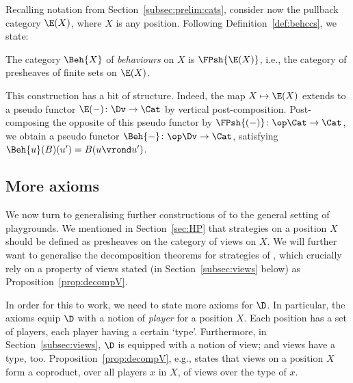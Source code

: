 \documentclass{LMCS}
\theoremstyle{plain}\newtheorem{satz}[thm]{Satz}
\begin{document}
   Recalling notation from Section~\ref{subsec:prelim:cats}, consider
   now the pullback category $\E(X)$, where $X$ is any position.
   Following Definition~\ref{def:behccs}, we state: \begin{defi}\label{def:beh}
  The category $\Beh{X}$ of \emph{behaviours} on $X$ is
  $\FPsh{\E(X)}$, i.e., the category of presheaves of finite sets on
  $\E (X)$.
\end{defi}
This construction has a bit of structure. Indeed, the
map $X \mapsto \E (X)$ extends to a pseudo functor $\E (-) \colon \Dv \to
\Cat$ by vertical post-composition.  Post-composing the opposite of
this pseudo functor by $\FPsh{(-)} \colon \op\Cat \to \Cat$, we obtain a
pseudo functor $\Beh{-} \colon \op\Dv \to \Cat$, satisfying $\Beh{u} (B) (u')
= B (u \vrond u')$.


\subsection{More axioms}
We now turn to generalising further constructions
of  to the general setting of
playgrounds.  We mentioned in Section~\ref{sec:HP} that strategies on
a position $X$ should be defined as presheaves on the category of
views on $X$.  We will further want to generalise the decomposition
theorems for strategies of , which
crucially rely on a property of views stated (in
Section~\ref{subsec:views} below) as Proposition~\ref{prop:decompV}.

In order for this to work, we need to state more axioms for $\D$.  In
particular, the axioms equip $\D$ with a notion of \emph{player} for a
position $X$.  Each position has a set of players, each player having
a certain `type'.  Furthermore, in Section~\ref{subsec:views}, $\D$ is
equipped with a notion of view; and views have a type, too.
Proposition~\ref{prop:decompV}, e.g., states that views on a position
$X$ form a coproduct, over all players $x$ in $X$, of views over the
type of $x$.
\end{document}
